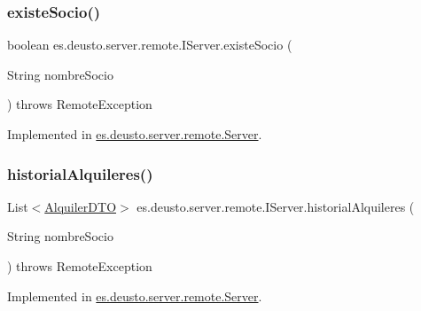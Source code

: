 \subsubsection{\texorpdfstring{existeSocio()}{existeSocio()}}
{\footnotesize\ttfamily boolean es.\+deusto.\+server.\+remote.\+I\+Server.\+existe\+Socio (\begin{DoxyParamCaption}\item[{String}]{nombre\+Socio }\end{DoxyParamCaption}) throws Remote\+Exception}



Implemented in \mbox{\hyperlink{classes_1_1deusto_1_1server_1_1remote_1_1_server_aba00b1ee900945e8004bc285d00a8c95}{es.\+deusto.\+server.\+remote.\+Server}}.

\mbox{\label{interfacees_1_1deusto_1_1server_1_1remote_1_1_i_server_ab6d4eec966b0e54e1b82c037dee7da23}} 
\subsubsection{\texorpdfstring{historialAlquileres()}{historialAlquileres()}}
{\footnotesize\ttfamily List$<$\mbox{\hyperlink{classes_1_1deusto_1_1server_1_1dto_1_1_alquiler_d_t_o}{Alquiler\+D\+TO}}$>$ es.\+deusto.\+server.\+remote.\+I\+Server.\+historial\+Alquileres (\begin{DoxyParamCaption}\item[{String}]{nombre\+Socio }\end{DoxyParamCaption}) throws Remote\+Exception}



Implemented in \mbox{\hyperlink{classes_1_1deusto_1_1server_1_1remote_1_1_server_a6aba80b9dc49313f765f5720aa4ae2a7}{es.\+deusto.\+server.\+remote.\+Server}}.

\mbox{\label{interfacees_1_1deusto_1_1server_1_1remote_1_1_i_server_a0815847d37ff0d87f0c2bdd8202b48bb}} 
